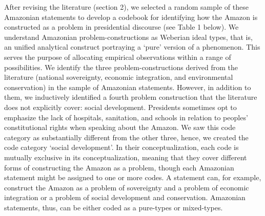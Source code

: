 \documentclass[]{interact}
\theoremstyle{plain}%
\theoremstyle{definition}
\theoremstyle{remark}
\begin{document}
After revising the literature (section 2), we selected a random sample
of these Amazonian statements to develop a codebook for identifying how
the Amazon is constructed as a problem in presidential discourse (see
Table 1 below). We understand Amazonian problem-constructions as
Weberian ideal types, that is, an unified analytical construct
portraying a `pure' version of a phenomenon. This serves the purpose of
allocating empirical observations within a range of possibilities. We
identify the three problem-constructions derived from the literature
(national sovereignty, economic integration, and environmental
conservation) in the sample of Amazonian statements. However, in
addition to them, we inductively identified a fourth problem
construction that the literature does not explicitly cover: social
development. Presidents sometimes opt to emphasize the lack of
hospitals, sanitation, and schools in relation to peoples'
constitutional rights when speaking about the Amazon. We saw this code
category as substantially different from the other three, hence, we
created the code category `social development'. In their
conceptualization, each code is mutually exclusive in its
conceptualization, meaning that they cover different forms of
constructing the Amazon as a problem, though each Amazonian statement
might be assigned to one or more codes. A statement can, for example,
construct the Amazon as a problem of sovereignty and a problem of
economic integration or a problem of social development and
conservation. Amazonian statements, thus, can be either coded as a
pure-types or mixed-types.
\end{document}
